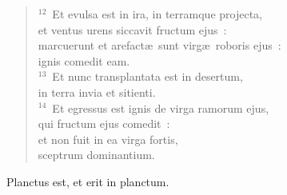 \begin{flushleft}
\begin{verse}
${}^{12}$~Et evulsa est in ira, in terramque projecta,\\ et ventus urens siccavit fructum ejus~:\\ marcuerunt et arefact\ae\ sunt virg\ae\ roboris ejus~:\\ ignis comedit eam.\\
${}^{13}$~Et nunc transplantata est in desertum,\\ in terra invia et sitienti.\\
${}^{14}$~Et egressus est ignis de virga ramorum ejus,\\ qui fructum ejus comedit~:\\ et non fuit in ea virga fortis,\\ sceptrum dominantium.\end{verse}\end{flushleft}

 Planctus est, et erit in planctum.

